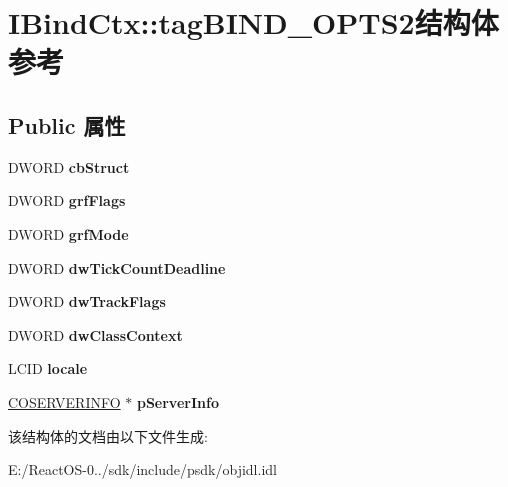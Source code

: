 \hypertarget{struct_i_bind_ctx_1_1tag_b_i_n_d___o_p_t_s2}{}\section{I\+Bind\+Ctx\+:\+:tag\+B\+I\+N\+D\+\_\+\+O\+P\+T\+S2结构体 参考}
\label{struct_i_bind_ctx_1_1tag_b_i_n_d___o_p_t_s2}
\subsection*{Public 属性}
\begin{DoxyCompactItemize}
\item 
\mbox{\label{struct_i_bind_ctx_1_1tag_b_i_n_d___o_p_t_s2_af6f4371dc3d3704b88914af207a7e8e7}} 
D\+W\+O\+RD {\bfseries cb\+Struct}
\item 
\mbox{\label{struct_i_bind_ctx_1_1tag_b_i_n_d___o_p_t_s2_a7f071c663e65cb5d4b826cd7fd41fbaa}} 
D\+W\+O\+RD {\bfseries grf\+Flags}
\item 
\mbox{\label{struct_i_bind_ctx_1_1tag_b_i_n_d___o_p_t_s2_aa8c91d9ad9b0920f746956378cbf17ac}} 
D\+W\+O\+RD {\bfseries grf\+Mode}
\item 
\mbox{\label{struct_i_bind_ctx_1_1tag_b_i_n_d___o_p_t_s2_a2e2f3cb994b03d516238ec437fbc90a7}} 
D\+W\+O\+RD {\bfseries dw\+Tick\+Count\+Deadline}
\item 
\mbox{\label{struct_i_bind_ctx_1_1tag_b_i_n_d___o_p_t_s2_a305b9f781ae4f601864f9421140c98e1}} 
D\+W\+O\+RD {\bfseries dw\+Track\+Flags}
\item 
\mbox{\label{struct_i_bind_ctx_1_1tag_b_i_n_d___o_p_t_s2_ac70772e4610260babeb5b5270b771041}} 
D\+W\+O\+RD {\bfseries dw\+Class\+Context}
\item 
\mbox{\label{struct_i_bind_ctx_1_1tag_b_i_n_d___o_p_t_s2_a1f3216bf06769f4c8ca6d0266341dcd2}} 
L\+C\+ID {\bfseries locale}
\item 
\mbox{\label{struct_i_bind_ctx_1_1tag_b_i_n_d___o_p_t_s2_a45d0b5c7132afdad868fdd3cf56b60a6}} 
\hyperlink{struct___c_o_s_e_r_v_e_r_i_n_f_o}{C\+O\+S\+E\+R\+V\+E\+R\+I\+N\+FO} $\ast$ {\bfseries p\+Server\+Info}
\end{DoxyCompactItemize}


该结构体的文档由以下文件生成\+:\begin{DoxyCompactItemize}
\item 
E\+:/\+React\+O\+S-\/0../sdk/include/psdk/objidl.\+idl\end{DoxyCompactItemize}
